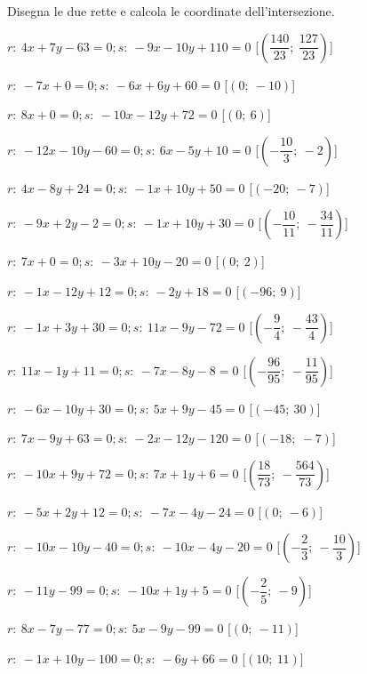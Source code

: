 \begin{esercizio}\label{ese:}
 Disegna le due rette e calcola le coordinate dell'intersezione.
 \begin{enumeratea}
  \item  $r:~4 x + 7 y - 63 = 0; s:~-9 x - 10 y + 110 = 0$ \hfill 
   [$\left(\dfrac{140}{23};~\dfrac{127}{23}\right)$]
  \item  $r:~-7 x + 0 = 0; s:~-6 x + 6 y + 60 = 0$ \hfill 
   [$\left(0;~-10\right)$]
  \item  $r:~8 x + 0 = 0; s:~-10 x - 12 y + 72 = 0$ \hfill 
   [$\left(0;~6\right)$]
  \item  $r:~-12 x - 10 y - 60 = 0; s:~6 x - 5 y + 10 = 0$ \hfill 
   [$\left(-\dfrac{10}{3};~-2\right)$]
  \item  $r:~4 x - 8 y + 24 = 0; s:~-1 x + 10 y + 50 = 0$ \hfill 
   [$\left(-20;~-7\right)$]
  \item  $r:~-9 x + 2 y - 2 = 0; s:~-1 x + 10 y + 30 = 0$ \hfill 
   [$\left(-\dfrac{10}{11};~-\dfrac{34}{11}\right)$]
  \item  $r:~7 x + 0 = 0; s:~-3 x + 10 y - 20 = 0$ \hfill 
   [$\left(0;~2\right)$]
  \item  $r:~-1 x - 12 y + 12 = 0; s:~-2 y + 18 = 0$ \hfill 
   [$\left(-96;~9\right)$]
  \item  $r:~-1 x + 3 y + 30 = 0; s:~11 x - 9 y - 72 = 0$ \hfill 
   [$\left(-\dfrac{9}{4};~-\dfrac{43}{4}\right)$]
  \item  $r:~11 x - 1 y + 11 = 0; s:~-7 x - 8 y - 8 = 0$ \hfill 
   [$\left(-\dfrac{96}{95};~-\dfrac{11}{95}\right)$]
  \item  $r:~-6 x - 10 y + 30 = 0; s:~5 x + 9 y - 45 = 0$ \hfill 
   [$\left(-45;~30\right)$]
  \item  $r:~7 x - 9 y + 63 = 0; s:~-2 x - 12 y - 120 = 0$ \hfill 
   [$\left(-18;~-7\right)$]
  \item  $r:~-10 x + 9 y + 72 = 0; s:~7 x + 1 y + 6 = 0$ \hfill 
   [$\left(\dfrac{18}{73};~-\dfrac{564}{73}\right)$]
  \item  $r:~-5 x + 2 y + 12 = 0; s:~-7 x - 4 y - 24 = 0$ \hfill 
   [$\left(0;~-6\right)$]
  \item  $r:~-10 x - 10 y - 40 = 0; s:~-10 x - 4 y - 20 = 0$ \hfill 
   [$\left(-\dfrac{2}{3};~-\dfrac{10}{3}\right)$]
  \item  $r:~-11 y - 99 = 0; s:~-10 x + 1 y + 5 = 0$ \hfill 
   [$\left(-\dfrac{2}{5};~-9\right)$]
  \item  $r:~8 x - 7 y - 77 = 0; s:~5 x - 9 y - 99 = 0$ \hfill 
   [$\left(0;~-11\right)$]
  \item  $r:~-1 x + 10 y - 100 = 0; s:~-6 y + 66 = 0$ \hfill 
   [$\left(10;~11\right)$]
 \end{enumeratea}
\end{esercizio}


